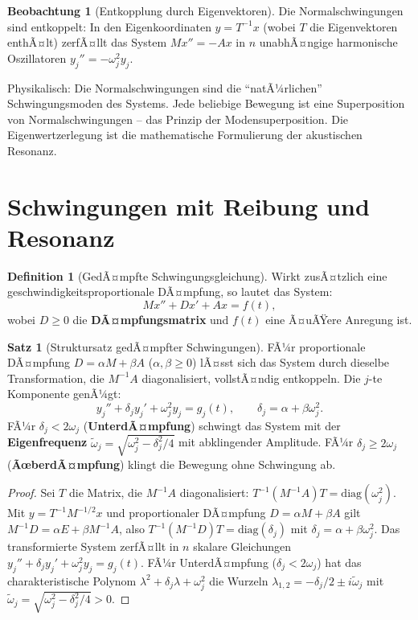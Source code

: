 ﻿\documentclass[a4paper,12pt]{report}
\theoremstyle{definition}
\newtheorem{definition}{Definition}
\newtheorem{satz}{Satz}
\newtheorem{beobachtung}{Beobachtung}
\begin{document}
\begin{beobachtung}[Entkopplung durch Eigenvektoren]
    Die Normalschwingungen sind entkoppelt: In den Eigenkoordinaten
    $y = T^{-1}x$ (wobei $T$ die Eigenvektoren enthÃ¤lt) zerfÃ¤llt das
    System $M x'' = -Ax$ in $n$ unabhÃ¤ngige harmonische Oszillatoren
    $y_j'' = -\omega_j^2 y_j$.

    Physikalisch: Die Normalschwingungen sind die ``natÃ¼rlichen''
    Schwingungsmoden des Systems. Jede beliebige Bewegung ist eine
    Superposition von Normalschwingungen -- das Prinzip der
    Modensuperposition. Die Eigenwertzerlegung ist die mathematische
    Formulierung der akustischen Resonanz.
\end{beobachtung}

\section{Schwingungen mit Reibung und Resonanz}

\begin{definition}[GedÃ¤mpfte Schwingungsgleichung]
    Wirkt zusÃ¤tzlich eine geschwindigkeitsproportionale DÃ¤mpfung, so
    lautet das System:
    \[
        M x'' + D x' + A x = f(t),
    \]
    wobei $D \geq 0$ die \textbf{DÃ¤mpfungsmatrix} und $f(t)$ eine
    Ã¤uÃŸere Anregung ist.
\end{definition}

\begin{satz}[Struktursatz gedÃ¤mpfter Schwingungen]
    FÃ¼r proportionale DÃ¤mpfung $D = \alpha M + \beta A$ ($\alpha, \beta \geq 0$)
    lÃ¤sst sich das System durch dieselbe Transformation, die $M^{-1}A$
    diagonalisiert, vollstÃ¤ndig entkoppeln. Die $j$-te Komponente genÃ¼gt:
    \[
        y_j'' + \delta_j y_j' + \omega_j^2 y_j = g_j(t),
        \qquad \delta_j = \alpha + \beta \omega_j^2.
    \]
    FÃ¼r $\delta_j < 2\omega_j$ (\textbf{UnterdÃ¤mpfung}) schwingt das
    System mit der \textbf{Eigenfrequenz} $\tilde{\omega}_j =
    \sqrt{\omega_j^2 - \delta_j^2/4}$ mit abklingender Amplitude.
    FÃ¼r $\delta_j \geq 2\omega_j$ (\textbf{ÃœberdÃ¤mpfung}) klingt die
    Bewegung ohne Schwingung ab.
\end{satz}
\begin{proof}
    Sei $T$ die Matrix, die $M^{-1}A$ diagonalisiert: $T^{-1}(M^{-1}A)T = \mathrm{diag}(\omega_j^2)$.
    Mit $y = T^{-1} M^{-1/2} x$ und proportionaler DÃ¤mpfung $D = \alpha M + \beta A$
    gilt $M^{-1}D = \alpha E + \beta M^{-1}A$, also $T^{-1}(M^{-1}D)T = \mathrm{diag}(\delta_j)$
    mit $\delta_j = \alpha + \beta \omega_j^2$.
    Das transformierte System zerfÃ¤llt in $n$ skalare Gleichungen
    $y_j'' + \delta_j y_j' + \omega_j^2 y_j = g_j(t)$.
    FÃ¼r UnterdÃ¤mpfung ($\delta_j < 2\omega_j$) hat das charakteristische Polynom
    $\lambda^2 + \delta_j \lambda + \omega_j^2$ die Wurzeln
    $\lambda_{1,2} = -\delta_j/2 \pm i\tilde{\omega}_j$ mit
    $\tilde{\omega}_j = \sqrt{\omega_j^2 - \delta_j^2/4} > 0$.
\end{proof}
\end{document}
